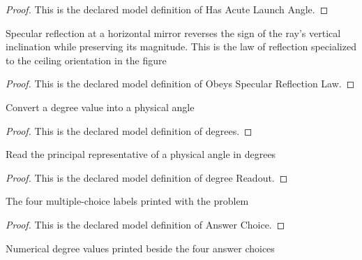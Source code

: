 \begin{proof}
  This is the declared model definition of Has Acute Launch Angle.
\end{proof}
\begin{definition}
  \label{def:physics:phyx-mini-0063:phyxminiproblems-problemphyxmini0063-obeysspecularreflectionlaw}
  Specular reflection at a horizontal mirror reverses the sign of the ray's vertical inclination while preserving its magnitude. This is the law of reflection specialized to the ceiling orientation in the figure
\end{definition}
\begin{proof}
  This is the declared model definition of Obeys Specular Reflection Law.
\end{proof}
\begin{definition}[degrees]
  \label{def:physics:phyx-mini-0063:phyxminiproblems-problemphyxmini0063-degrees}
  Convert a degree value into a physical angle
\end{definition}
\begin{proof}
  This is the declared model definition of degrees.
\end{proof}
\begin{definition}
  \label{def:physics:phyx-mini-0063:phyxminiproblems-problemphyxmini0063-degreereadout}
  Read the principal representative of a physical angle in degrees
\end{definition}
\begin{proof}
  This is the declared model definition of degree Readout.
\end{proof}
\begin{definition}
  \label{def:physics:phyx-mini-0063:phyxminiproblems-problemphyxmini0063-answerchoice}
  The four multiple-choice labels printed with the problem
\end{definition}
\begin{proof}
  This is the declared model definition of Answer Choice.
\end{proof}
\begin{definition}
  \label{def:physics:phyx-mini-0063:phyxminiproblems-problemphyxmini0063-answerchoice-degreevalue}
  Numerical degree values printed beside the four answer choices
\end{definition}
